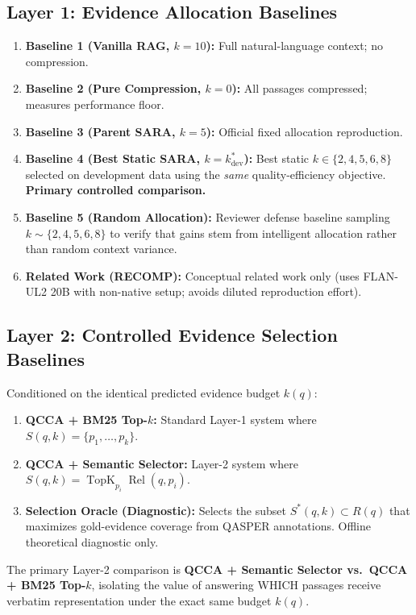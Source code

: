\documentclass[11pt,a4paper]{article}
\begin{document}
\subsection{Layer 1: Evidence Allocation Baselines}
\begin{enumerate}
    \item \textbf{Baseline 1 (Vanilla RAG, $k=10$):} Full natural-language context; no compression.
    \item \textbf{Baseline 2 (Pure Compression, $k=0$):} All passages compressed; measures performance floor.
    \item \textbf{Baseline 3 (Parent SARA, $k=5$):} Official fixed allocation reproduction.
    \item \textbf{Baseline 4 (Best Static SARA, $k=k_{\text{dev}}^*$):} Best static $k \in \{2, 4, 5, 6, 8\}$ selected on development data using the \textit{same} quality-efficiency objective. \textbf{Primary controlled comparison.}
    \item \textbf{Baseline 5 (Random Allocation):} Reviewer defense baseline sampling $k \sim \{2, 4, 5, 6, 8\}$ to verify that gains stem from intelligent allocation rather than random context variance.
    \item \textbf{Related Work (RECOMP):} Conceptual related work only (uses FLAN-UL2 20B with non-native setup; avoids diluted reproduction effort).
\end{enumerate}

\subsection{Layer 2: Controlled Evidence Selection Baselines}
Conditioned on the identical predicted evidence budget $k(q)$:
\begin{enumerate}[label=(\alph*)]
    \item \textbf{QCCA + BM25 Top-$k$:} Standard Layer-1 system where $S(q, k) = \{p_1, \dots, p_k\}$.
    \item \textbf{QCCA + Semantic Selector:} Layer-2 system where $S(q, k) = \operatorname{TopK}_{p_i} \operatorname{Rel}(q, p_i)$.
    \item \textbf{Selection Oracle (Diagnostic):} Selects the subset $S^*(q, k) \subset R(q)$ that maximizes gold-evidence coverage from QASPER annotations. Offline theoretical diagnostic only.
\end{enumerate}
The primary Layer-2 comparison is \textbf{QCCA + Semantic Selector vs.\ QCCA + BM25 Top-$k$}, isolating the value of answering WHICH passages receive verbatim representation under the exact same budget $k(q)$.
\end{document}
